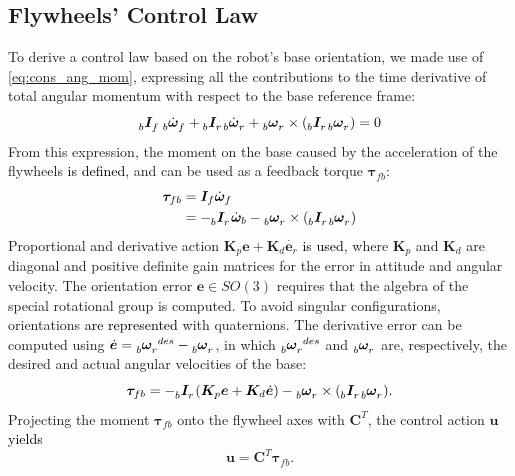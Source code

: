 \documentclass[sensors,article,accept,pdftex,moreauthors]{Definitions/mdpi}
\newcommand{\MF}[1]{\textcolor{black}{#1}}
\begin{document}
\subsection{Flywheels' Control Law}
\label{subsec:control_law}
To derive a control law based on the robot's base orientation, we made use of \eqref{eq:cons_ang_mom}, expressing all the contributions to the time derivative of total angular momentum with respect to the base reference frame:
\begin{equation}
\tensor[_b]{\bm{I}}{_f} \, \tensor[_b]{\dot{\bm{\omega}}}{_f} + \tensor[_b]{\bm{I}}{_r} \tensor[_b]{\dot{\bm{\omega}}}{_r} + \tensor[_b]{\bm{\omega}}{_r} \times \left( \tensor[_b]{\bm{I}}{_r} \tensor[_b]{\bm{\omega}}{_r}\right) = 0
\end{equation}
From this expression, the moment on the base caused by the acceleration of the flywheels \MF{is defined}, and can be used as a feedback torque $\bm{\tau}_{fb}$:
\begin{equation}
\begin{split}
\bm{\tau}_{fb} &= \bm{I}_f \dot{\bm{\omega}}_f \\
&= - \tensor[_b]{\bm{I}}{_r} \dot{\bm{\omega}}_b - \tensor[_b]{\bm{\omega}}{_r} \times \left( \tensor[_b]{\bm{I}}{_r} \tensor[_b]{\bm{\omega}}{_r}\right)
\end{split}
\end{equation}
Proportional and derivative action $\bm{K}_p \bm{e} + \bm{K}_d \dot{\bm{e}_r}$ \MF{is used}, where $\bm{K}_p$ and $\bm{K}_d$ are diagonal and positive definite gain matrices for the error in attitude and angular velocity.
The orientation error $\bm{e} \in SO(3)$ requires that the algebra of the special rotational group is computed. To avoid singular configurations, orientations \MF{are represented} with quaternions.
The derivative error can be computed using $\dot{\bm{e}} = \tensor[_b]{\bm{\omega}}{_r^{des}} - \tensor[_b]{\bm{\omega}}{_r}$, in which $\tensor[_b]{\bm{\omega}}{_r^{des}}$ and $\tensor[_b]{\bm{\omega}}{_r}$ are, respectively, the desired and actual angular velocities of the base:
\begin{equation}
\bm{\tau}_{fb} = - \tensor[_b]{\bm{I}}{_r} \left(\bm{K}_p \bm{e} + \bm{K}_d \dot{\bm{e}}\right) - \tensor[_b]{\bm{\omega}}{_r} \times \left( \tensor[_b]{\bm{I}}{_r} \tensor[_b]{\bm{\omega}}{_r}\right).
\end{equation}
Projecting the moment $\bm{\tau}_{fb}$ onto the flywheel axes with $\bm{C}^T$, the control action $\bm{u}$ \MF{yields}
\begin{equation}
\label{eq:ctrl_law}
\bm{u} = \bm{C}^T \bm{\tau}_{fb}.
\end{equation}
\end{document}
